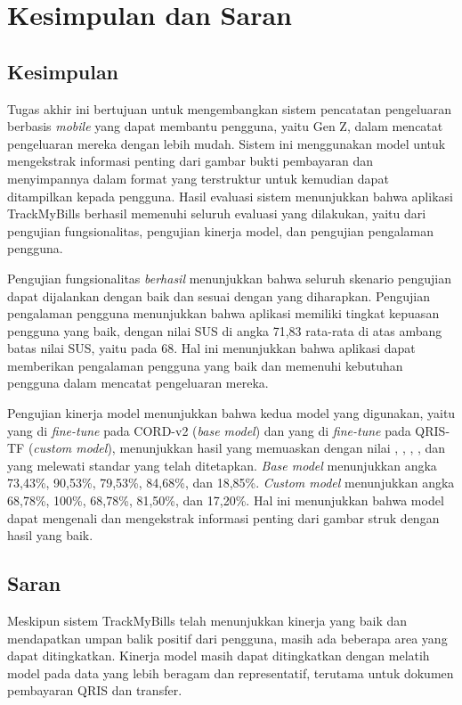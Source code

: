 \chapter{Kesimpulan dan Saran}

\section{Kesimpulan}
\label{sec:kesimpulan}
Tugas akhir ini bertujuan untuk mengembangkan sistem pencatatan pengeluaran berbasis \emph{mobile} yang dapat membantu pengguna, yaitu Gen Z, dalam mencatat pengeluaran mereka dengan lebih mudah. Sistem ini menggunakan model \donut{} untuk mengekstrak informasi penting dari gambar bukti pembayaran dan menyimpannya dalam format yang terstruktur untuk kemudian dapat ditampilkan kepada pengguna. Hasil evaluasi sistem menunjukkan bahwa aplikasi TrackMyBills berhasil memenuhi seluruh evaluasi yang dilakukan, yaitu dari pengujian fungsionalitas, pengujian kinerja model, dan pengujian pengalaman pengguna. 

Pengujian fungsionalitas \emph{berhasil} menunjukkan bahwa seluruh skenario pengujian dapat dijalankan dengan baik dan sesuai dengan yang diharapkan. Pengujian pengalaman pengguna menunjukkan bahwa aplikasi memiliki tingkat kepuasan pengguna yang baik, dengan nilai SUS di angka 71,83 rata-rata di atas ambang batas nilai SUS, yaitu pada 68. Hal ini menunjukkan bahwa aplikasi dapat memberikan pengalaman pengguna yang baik dan memenuhi kebutuhan pengguna dalam mencatat pengeluaran mereka.

Pengujian kinerja model menunjukkan bahwa kedua model yang digunakan, yaitu \donut{} yang di \emph{fine-tune} pada \dataset{} CORD-v2 (\emph{base model}) dan \donut{} yang di \emph{fine-tune} pada \dataset{} QRIS-TF (\emph{custom model}), menunjukkan hasil yang memuaskan dengan nilai \accuracy, \precision, \recall, \fscore, dan \mcer{} yang melewati standar yang telah ditetapkan. \emph{Base model} menunjukkan angka \accuracy{} 73,43\%, \precision{} 90,53\%, \recall{} 79,53\%, \fscore{} 84,68\%, dan \mcer{} 18,85\%. \emph{Custom model} menunjukkan angka \accuracy{} 68,78\%, \precision{} 100\%, \recall{} 68,78\%, \fscore{} 81,50\%, dan \mcer{} 17,20\%. Hal ini menunjukkan bahwa model dapat mengenali dan mengekstrak informasi penting dari gambar struk dengan hasil yang baik.

\section{Saran}
\label{sec:saran}
Meskipun sistem TrackMyBills telah menunjukkan kinerja yang baik dan mendapatkan umpan balik positif dari pengguna, masih ada beberapa area yang dapat ditingkatkan. Kinerja model \donut{} masih dapat ditingkatkan dengan melatih model pada data yang lebih beragam dan representatif, terutama untuk dokumen pembayaran QRIS dan transfer. 

